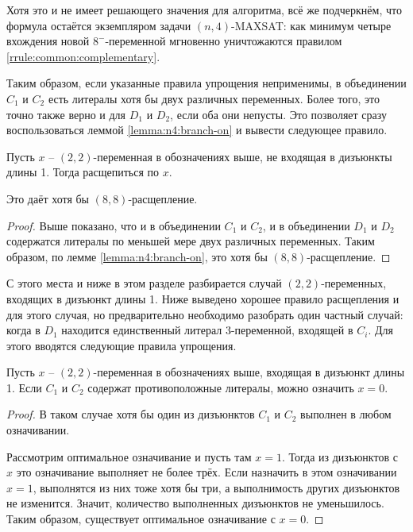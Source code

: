 Хотя это и не имеет решающего значения для алгоритма, всё же подчеркнём, что формула остаётся экземпляром задачи $(n,4)$-MAXSAT: как минимум четыре вхождения новой $8^-$-переменной мгновенно уничтожаются правилом \ref{rrule:common:complementary}.

Таким образом, если указанные правила упрощения неприменимы, в объединении $C_1$ и $C_2$ есть литералы хотя бы двух различных переменных.
Более того, это точно также верно и для $D_1$ и $D_2$, если оба они непусты.
Это позволяет сразу воспользоваться леммой \ref{lemma:n4:branch-on} и вывести следующее правило.

\begin{brule}
 Пусть $x$ -- $(2,2)$-переменная в обозначениях выше, не входящая в дизъюнкты длины 1. Тогда расщепиться по $x$.

 Это даёт хотя бы $(8,8)$-расщепление.
 \label{brule:n4:22:nouc}
\end{brule}

\begin{proof}
 Выше показано, что и в объединении $C_1$ и $C_2$, и в объединении $D_1$ и $D_2$ содержатся литералы по меньшей мере двух различных переменных. Таким образом, по лемме \ref{lemma:n4:branch-on}, это хотя бы $(8,8)$-расщепление.
\end{proof}

С этого места и ниже в этом разделе разбирается случай $(2,2)$-переменных, входящих в дизъюнкт длины 1.
Ниже выведено хорошее правило расщепления и для этого случая, но предварительно необходимо разобрать один частный случай: когда в $D_1$ находится единственный литерал 3-переменной, входящей в $C_i$. Для этого вводятся следующие правила упрощения.

\begin{rrule}
 Пусть $x$ -- $(2,2)$-переменная в обозначениях выше, входящая в дизъюнкт длины 1. Если $C_1$ и $C_2$ содержат противоположные литералы, можно означить $x = 0$.
 \label{rrule:n4:22:uc-compl}
\end{rrule}

\begin{proof}
 В таком случае хотя бы один из дизъюнктов $C_1$ и $C_2$ выполнен в любом означивании.

 Рассмотрим оптимальное означивание и пусть там $x = 1$. Тогда из дизъюнктов с $x$ это означивание выполняет не более трёх. Если назначить в этом означивании $x = 1$, выполнятся из них тоже хотя бы три, а выполнимость других дизъюнктов не изменится. Значит, количество выполненных дизъюнктов не уменьшилось. Таким образом, существует оптимальное означивание с $x = 0$.
\end{proof}

